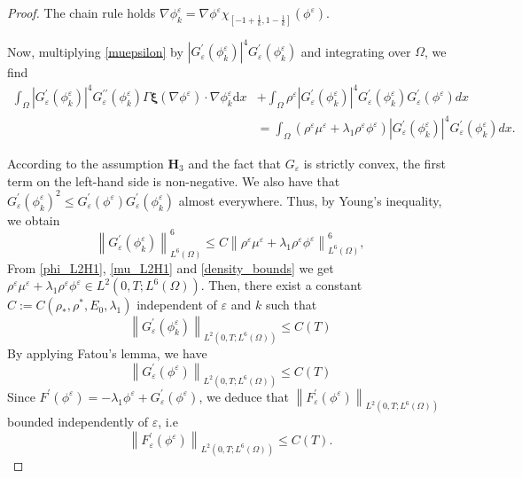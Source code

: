 \documentclass[11pt]{article}
\def\bq{\begin{equation}}
\def\eq{\end{equation}}
\def\bfxi{\boldsymbol{\xi}}
\def\md{\mathrm{d}}
\def\bq{\begin{equation}}
\def\eq{\end{equation}}
\def\Ga{\Gamma}
\begin{document}
{\begin{proof}
The chain rule holds $\nabla \phi_k^{\varepsilon}=\nabla \phi^{\varepsilon} \chi_{\left[-1+\frac{1}{k}, 1-\frac{1}{k}\right]}(\phi^{\varepsilon})$.

Now, multiplying \eqref{muepsilon} by $\left|G_{\varepsilon}^{\prime}\left(\phi_k^{\varepsilon}\right)\right|^{4} G_{\varepsilon}^{\prime}\left(\phi_k^{\varepsilon}\right)$ and integrating over $\Omega$, we find
$$
\begin{aligned}
\int_{\Omega}\left|G_{\varepsilon}^{\prime}\left(\phi_k^{\varepsilon}\right)\right|^{4} G_{\varepsilon}^{\prime \prime}\left(\phi_k^{\varepsilon}\right) \Ga\bfxi(\nabla \phi^{\varepsilon}) \cdot \nabla \phi_k^{\varepsilon} \md x &+\int_{\Omega} \rho^{\varepsilon}\left|G_{\varepsilon}^{\prime}\left(\phi_k^{\varepsilon}\right)\right|^{4} G_{\varepsilon}^{\prime}\left(\phi_k^{\varepsilon}\right) G_{\varepsilon}^{\prime}(\phi^{\varepsilon}) d x \\
&=\int_{\Omega}\left(\rho^{\varepsilon} \mu^{\varepsilon}+\lambda_1 \rho^{\varepsilon}\phi^{\varepsilon}\right)\left|G_{\varepsilon}^{\prime}\left(\phi_k^{\varepsilon}\right)\right|^{4} G_{\varepsilon}^{\prime}\left(\phi_k^{\varepsilon}\right) d x .
\end{aligned}
$$

According to the assumption $\textbf{H}_3$ and the fact that $G_{\varepsilon}$ is strictly convex, the first term on the left-hand side is non-negative. We also have that $G_{\varepsilon}^{\prime}\left(\phi_k^{\varepsilon}\right)^2 \leq G_{\varepsilon}^{\prime}(\phi^{\varepsilon}) G_{\varepsilon}^{\prime}\left(\phi_k^{\varepsilon}\right)$ almost everywhere. Thus, by Young's inequality, we obtain
$$
\left\|G_{\varepsilon}^{\prime}\left(\phi_k^{\varepsilon}\right)\right\|_{L^6(\Omega)}^6 \leq C\left\|\rho^{\varepsilon} \mu^{\varepsilon}+ \lambda_1\rho^{\varepsilon}\phi^{\varepsilon}\right\|_{L^6(\Omega)}^6,
$$
From  \eqref{phi_L2H1}, \eqref{mu_L2H1} and \eqref{density_bounds} we get $\rho^{\varepsilon} \mu^{\varepsilon}+ \lambda_1\rho^{\varepsilon}\phi^{\varepsilon}\in {L^2(0,T;{L^6(\Omega)})}$. Then, there exist a constant $C:=C(\rho_*,\rho^*,E_0,\lambda_1)$ independent of $\varepsilon$ and $k$ such that 
$$\left\|G_{\varepsilon}^{\prime}\left(\phi_k^{\varepsilon}\right)\right\|_{L^2(0,T;{L^6(\Omega)})} \leq C(T)$$ By applying Fatou's lemma, we have 
$$\left\|G_{\varepsilon}^{\prime}\left(\phi^{\varepsilon}\right)\right\|_{L^2(0,T;{L^6(\Omega)})} \leq C(T)$$
Since $F^{\prime} (\phi^{\varepsilon}) = -\lambda_1 \phi^{\varepsilon} + G^{\prime}_{\varepsilon}(\phi^{\varepsilon})$, we deduce that $\left\|F_{\varepsilon}^{\prime}\left(\phi^{\varepsilon}\right)\right\|_{L^2(0,T;{L^6(\Omega)})}$ bounded independently of $\varepsilon$, i.e
\bq
\left\|F_{\varepsilon}^{\prime}\left(\phi^{\varepsilon}\right)\right\|_{L^2(0,T;{L^6(\Omega)})} \leq C(T).\label{F_L2_L6}
\eq
{  

}
\end{proof}}
\end{document}
